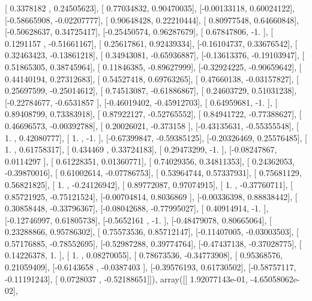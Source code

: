 \documentclass{article}
\begin{document}
       [ 0.3378182 ,  0.24505623],
       [ 0.77034832,  0.90470035],
       [-0.00133118,  0.60024122],
       [-0.58665908, -0.02207777],
       [ 0.90648428,  0.22210444],
       [ 0.80977548,  0.64660848],
       [-0.50628637,  0.34725417],
       [-0.25450574,  0.96287679],
       [ 0.67847806, -1.        ],
       [ 0.1291157 , -0.51661167],
       [ 0.25617861,  0.92439334],
       [-0.16104737,  0.33676542],
       [ 0.32463423, -0.13861218],
       [ 0.34943081, -0.65936887],
       [-0.13613376, -0.19103947],
       [ 0.51865305,  0.38745964],
       [ 0.11846385, -0.89627999],
       [-0.32924225, -0.90659642],
       [ 0.44140194,  0.27312683],
       [ 0.54527418,  0.69763265],
       [ 0.47660138, -0.03157827],
       [ 0.25697599, -0.25014612],
       [ 0.74513087, -0.61886867],
       [ 0.24603729,  0.51031238],
       [-0.22784677, -0.6531857 ],
       [-0.46019402, -0.45912703],
       [ 0.64959681, -1.        ],
       [ 0.89408799,  0.73383918],
       [ 0.87922127, -0.52765552],
       [ 0.84941722, -0.77388627],
       [ 0.46696573, -0.00392788],
       [ 0.20026021, -0.373158  ],
       [-0.43135631, -0.55355548],
       [ 1.        ,  0.42080777],
       [ 1.        , -1.        ],
       [-0.67399847, -0.59385125],
       [-0.20326469,  0.25576485],
       [ 1.        ,  0.61758317],
       [ 0.434469  ,  0.33724183],
       [ 0.29473299, -1.        ],
       [-0.08247867,  0.0114297 ],
       [ 0.61228351,  0.01360771],
       [ 0.74029356,  0.34811353],
       [ 0.24362053, -0.39870016],
       [ 0.61002614, -0.07786753],
       [ 0.53964744,  0.57337931],
       [ 0.75681129,  0.56821825],
       [ 1.        , -0.24126942],
       [ 0.89772087,  0.97074915],
       [ 1.        , -0.37760711],
       [ 0.85721925, -0.75121524],
       [-0.00704814,  0.8036869 ],
       [-0.00336398,  0.88838442],
       [ 0.30858448, -0.33796367],
       [-0.08042688, -0.77995027],
       [ 0.40914914, -1.        ],
       [-0.12746997,  0.61805738],
       [-0.5652161 , -1.        ],
       [-0.48479078,  0.80665064],
       [ 0.23288866,  0.95786302],
       [ 0.75573536,  0.85712147],
       [-0.11407005, -0.03003503],
       [ 0.57176885, -0.78552695],
       [-0.52987288,  0.39774764],
       [-0.47437138, -0.37028775],
       [ 0.14226378,  1.        ],
       [ 1.        ,  0.08270055],
       [ 0.78673536, -0.34773908],
       [ 0.95368576,  0.21059409],
       [-0.6143658 , -0.0387403 ],
       [-0.39576193,  0.61730502],
       [-0.58757117, -0.11191243],
       [ 0.0728037 , -0.52188651]]), array([[ 1.92077143e-01, -4.65058062e-02],
\end{document}
